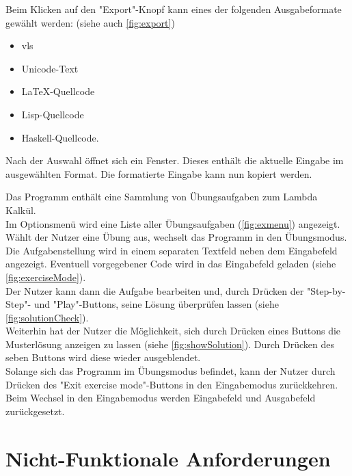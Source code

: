 \documentclass[parskip=full,11pt,twoside]{scrartcl}
\begin{document}
Beim Klicken auf den "Export"-Knopf kann eines der folgenden Ausgabeformate gewählt werden: (siehe auch \cref{fig:export})
\begin{itemize}
\item \gls{vls}
\item Unicode-Text
\item \LaTeX-Quellcode
\item Lisp-Quellcode
\item Haskell-Quellcode.
\end{itemize}
Nach der Auswahl öffnet sich ein Fenster.
Dieses enthält die aktuelle Eingabe im ausgewählten Format.
Die formatierte Eingabe kann nun kopiert werden.

Das Programm enthält eine Sammlung von Übungsaufgaben zum Lambda Kalkül.\\
Im Optionsmenü wird eine Liste aller Übungsaufgaben (\cref{fig:exmenu}) angezeigt.\\
Wählt der Nutzer eine Übung aus, wechselt das Programm in den Übungsmodus. Die Aufgabenstellung wird in einem separaten Textfeld neben dem Eingabefeld angezeigt. Eventuell vorgegebener Code wird in das Eingabefeld geladen (siehe \cref{fig:exerciseMode}).\\
Der Nutzer kann dann die Aufgabe bearbeiten und, durch Drücken der "Step-by-Step"- und "Play"-Buttons, seine Lösung überprüfen lassen (siehe \cref{fig:solutionCheck}).\\
Weiterhin hat der Nutzer die Möglichkeit, sich durch Drücken eines Buttons die Musterlösung anzeigen zu lassen (siehe \cref{fig:showSolution}). Durch Drücken des seben Buttons wird diese wieder ausgeblendet. \\
Solange sich das Programm im Übungsmodus befindet, kann der Nutzer durch Drücken des "Exit exercise mode"-Buttons in den Eingabemodus zurückkehren.\\
Beim Wechsel in den Eingabemodus werden Eingabefeld und Ausgabefeld zurückgesetzt.


\section{Nicht-Funktionale Anforderungen}

\end{document}
